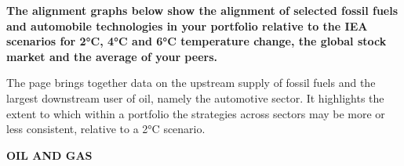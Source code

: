 \documentclass[10pt,twoside,table]{article}\usepackage[]{graphicx}\usepackage[]{color}
\begin{document}
	\textbf{The alignment graphs below show the alignment of selected fossil fuels and automobile technologies in your portfolio relative to the IEA scenarios for 2°C, 4°C and 6°C temperature change, the global stock market and the average of your peers. } 
	
	The page brings together data on the upstream supply of fossil fuels and the largest downstream user of oil, namely the automotive sector. It highlights the extent to which within a portfolio the strategies across sectors may be more or less consistent, relative to a 2°C scenario.
	 
	
	\vspace{1cm}
	
	\begin{center}
		\textbf{OIL AND GAS}
	\end{center}
	
\end{document}

